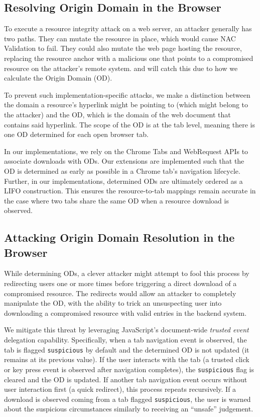 \subsection{Resolving Origin Domain in the Browser}

To execute a resource integrity attack on a web server, an attacker generally
has two paths. They can mutate the resource in place, which would cause NAC
Validation to fail. They could also mutate the web page hosting the resource,
replacing the resource anchor with a malicious one that points to a compromised
resource on the attacker's remote system. \DNSSYS{} and \DHTSYS{} will catch
this due to how we calculate the Origin Domain (OD).

To prevent such implementation-specific attacks, we make a distinction between
the domain a resource's hyperlink might be pointing to (which might belong to
the attacker) and the OD, which is the domain of the web document that contains
said hyperlink. The scope of the OD is at the tab level, meaning there is one OD
determined for each open browser tab.

In our implementations, we rely on the Chrome Tabs and WebRequest APIs to
associate downloads with ODs. Our extensions are implemented such that the OD is
determined as early as possible in a Chrome tab's navigation lifecycle. Further,
in our implementations, determined ODs are ultimately ordered as a LIFO
construction. This ensures the resource-to-tab mappings remain accurate in the
case where two tabs share the same OD when a resource download is observed.

\subsection{Attacking Origin Domain Resolution in the Browser}

While determining ODs, a clever attacker might attempt to fool this process by
redirecting users one or more times before triggering a direct download of a
compromised resource. The redirects would allow an attacker to completely
manipulate the OD, with the ability to trick an unsuspecting user into
downloading a compromised resource with valid entries in the backend system.

We mitigate this threat by leveraging JavaScript's document-wide \emph{trusted
event}~\cite{TrustedEvents} delegation capability. Specifically, when a tab
navigation event is observed, the tab is flagged \texttt{suspicious} by default
and the determined OD is not updated (\ie it remains at its previous value). If
the user interacts with the tab (\ie a trusted click or key press event is
observed after navigation completes), the \texttt{suspicious} flag is cleared
and the OD is updated. If another tab navigation event occurs without user
interaction first (\eg a quick redirect), this process repeats recursively. If a
download is observed coming from a tab flagged \texttt{suspicious}, the user is
warned about the suspicious circumstances similarly to receiving an ``unsafe''
judgement.

